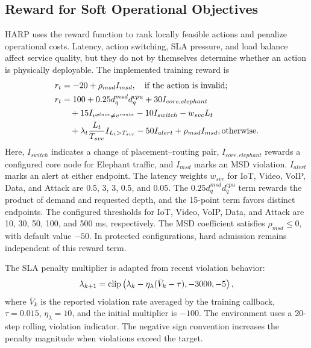 \documentclass[final,5p]{elsarticle}
\newcommand{\rev}[1]{\textcolor{revisiongreen}{#1}}
\begin{document}
\subsection{Reward for Soft Operational Objectives}
\label{subsec:harp_penalty}

HARP uses the reward function \rev{to rank locally feasible actions and penalize operational costs}. Latency, \rev{action switching}, SLA pressure, and load balance affect service quality, but they do not by themselves determine whether an action is physically deployable. \rev{The implemented training reward is}
\begin{equation}
\rev{\begin{aligned}
r_t&=-20+\rho_{msd}I_{msd}, \quad \text{if the action is invalid};\\
r_t&=100+0.25d_q^{msd}d_q^{cpu}+30I_{core,elephant}\\
&\quad+15I_{v^{place}\ne v^{route}}-10I_{switch}-w_{svc}L_t\\
&\quad+\lambda_t\frac{L_t}{T_{svc}}I_{L_t>T_{svc}}-50I_{alert}+\rho_{msd}I_{msd}, \text{otherwise}.
\end{aligned}}
\label{eq:harp_reward}
\end{equation}
\rev{Here, \(I_{switch}\) indicates a change of placement--routing pair, \(I_{core,elephant}\) rewards a configured core node for Elephant traffic, and \(I_{msd}\) marks an MSD violation. \(I_{alert}\) marks an alert at either endpoint. The latency weights \(w_{svc}\) for IoT, Video, VoIP, Data, and Attack are 0.5, 3, 3, 0.5, and 0.05. The \(0.25d_q^{msd}d_q^{cpu}\) term rewards the product of demand and requested depth, and the 15-point term favors distinct endpoints. The configured thresholds for IoT, Video, VoIP, Data, and Attack are 10, 30, 50, 100, and 500 ms, respectively. The MSD coefficient satisfies \(\rho_{msd}\le0\), with default value \(-50\). In protected configurations, hard admission remains independent of this reward term.}

The SLA penalty multiplier is adapted from recent violation behavior:
\begin{equation}
\rev{\lambda_{k+1}=\mathrm{clip}\left(\lambda_k-\eta_\lambda(\bar{V}_k-\tau),-3000,-5\right),}
\label{eq:lambda_update}
\end{equation}
\rev{where \(\bar V_k\) is the reported violation rate averaged by the training callback, \(\tau=0.015\), \(\eta_\lambda=10\), and the initial multiplier is \(-100\). The environment uses a 20-step rolling violation indicator. The negative sign convention increases the penalty magnitude when violations exceed the target.}
\end{document}
